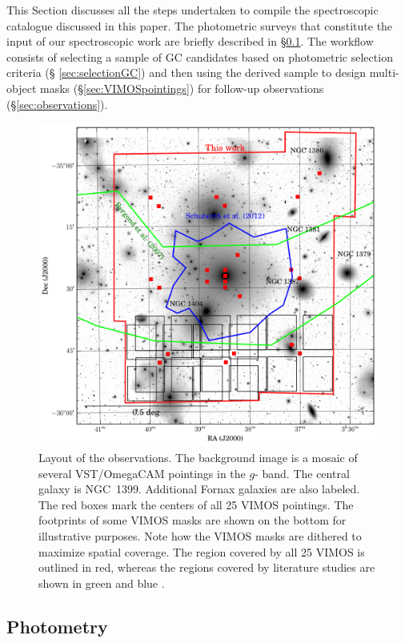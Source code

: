 \documentclass[usenatbib]{mnras}
\begin{document}
This Section discusses all the steps undertaken to compile the spectroscopic 
catalogue discussed in this paper. The photometric surveys that constitute the input 
of our spectroscopic work are briefly described in \S\ref{sec:phot}. The 
workflow consists of selecting a sample of GC candidates based on photometric 
selection criteria (\S 
\ref{sec:selectionGC}) and then using the derived sample to design multi-object 
masks (\S \ref{sec:VIMOSpointings}) for follow-up 
observations (\S \ref{sec:observations}).

\begin{figure}
\centering
\includegraphics[scale=0.7]{figures/fov.png} 
\caption{Layout of the observations. The background image is a mosaic of 
several VST/OmegaCAM pointings in the $g$-
band. The central galaxy is NGC~1399. Additional Fornax galaxies are also 
labeled. The red boxes mark the centers of all 
25 VIMOS pointings. The footprints of some VIMOS masks are shown on the bottom 
for illustrative purposes. Note how 
the VIMOS masks are dithered to maximize spatial coverage. The region 
covered by all 25 VIMOS is outlined in red, 
whereas the regions covered by literature studies are shown in green 
\citep{Bergond07} and blue \citep{Schuberth}.}
\label{fig:fov}
\end{figure}

\subsection{Photometry}
\label{sec:phot}
\end{document}
